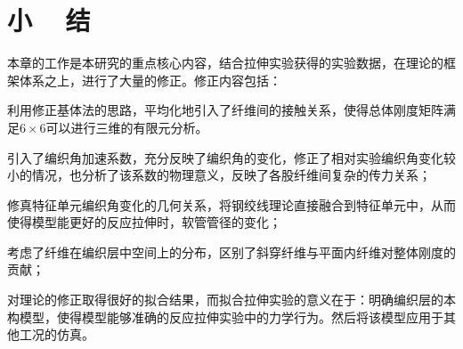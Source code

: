 \begin{figure}[!htbp]
\centering
{}
\label{fig:final}
\end{figure}


\section{小 ~ 结}
本章的工作是本研究的重点核心内容，结合拉伸实验获得的实验数据，在\ha 理论的框架体系之上，进行了大量的修正。修正内容包括：
\begin{compactitem}
	\item 利用修正基体法的思路，平均化地引入了纤维间的接触关系，使得总体刚度矩阵满足$ 6\times6 $可以进行三维的有限元分析。
	\item 引入了编织角加速系数，充分反映了编织角的变化，修正了相对实验编织角变化较小的情况，也分析了该系数的物理意义，反映了各股纤维间复杂的传力关系；
	\item 修真特征单元编织角变化的几何关系，将钢绞线理论直接融合到特征单元中，从而使得模型能更好的反应拉伸时，软管管径的变化；
	\item  考虑了纤维在编织层中空间上的分布，区别了斜穿纤维与平面内纤维对整体刚度的贡献；
\end{compactitem}

对理论的修正取得很好的拟合结果，而拟合拉伸实验的意义在于：明确编织层的本构模型，使得模型能够准确的反应拉伸实验中的力学行为。然后将该模型应用于其他工况的仿真。
